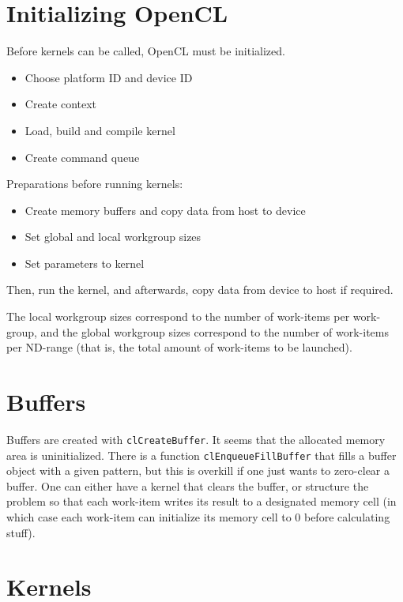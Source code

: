 \documentclass[a4paper,11pt]{article}
\begin{document}
\section{Initializing OpenCL}

Before kernels can be called, OpenCL must be initialized.

\begin{itemize}
	\item Choose platform ID and device ID
	\item Create context
	\item Load, build and compile kernel
	\item Create command queue
\end{itemize}

Preparations before running kernels:

\begin{itemize}
	\item Create memory buffers and copy data from host to device
	\item Set global and local workgroup sizes
	\item Set parameters to kernel
\end{itemize}

Then, run the kernel, and afterwards, copy data from device to host if required.

The local workgroup sizes correspond to the number of work-items per work-group, and the global workgroup sizes correspond to the number of work-items per ND-range (that is, the total amount of work-items to be launched).

\section{Buffers}

Buffers are created with \texttt{clCreateBuffer}. It seems that the allocated memory area is uninitialized. There is a function \texttt{clEnqueueFillBuffer} that fills a buffer object with a given pattern, but this is overkill if one just wants to zero-clear a buffer. One can either have a kernel that clears the buffer, or structure the problem so that each work-item writes its result to a designated memory cell (in which case each work-item can initialize its memory cell to 0 before calculating stuff).

\section{Kernels}
\end{document}
